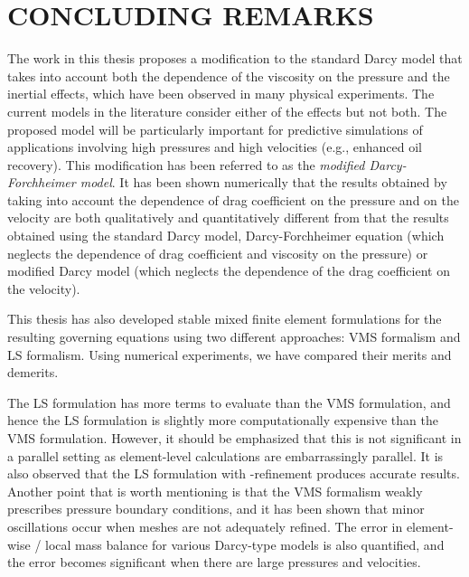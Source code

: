 \documentclass[11pt,reqno]{amsart}
\begin{document}
\section{CONCLUDING REMARKS}
\label{Ch:Conclusions}

The work in this thesis proposes a modification to the 
standard Darcy model that takes into account both the 
dependence of the viscosity on the pressure and the 
inertial effects, which have been observed in many 
physical experiments. The current models in the 
literature consider either of the effects but not 
both. The proposed model will be particularly important 
for predictive simulations of applications involving 
high pressures and high velocities (e.g., enhanced oil 
recovery). This modification has been referred to as the 
\emph{modified Darcy-Forchheimer model}. 
It has been shown numerically that the results obtained by 
taking into account the dependence of drag coefficient 
on the pressure and on the velocity are both qualitatively 
and quantitatively different from that the results obtained 
using the standard Darcy model, Darcy-Forchheimer equation 
(which neglects the dependence of drag coefficient and 
viscosity on the pressure) or modified Darcy model 
\cite{Nakshatrala_Rajagopal_IJNMF_2011_v67_p342,
Nakshatrala_Turner_2013_arXiv} (which neglects the 
dependence of the drag coefficient on the velocity). 

This thesis has also developed stable mixed finite element formulations 
for the resulting governing equations using two different 
approaches: VMS formalism and LS formalism. Using numerical experiments, 
we have compared their merits and demerits. 


The LS formulation has more terms to evaluate than the VMS formulation, 
and hence the LS formulation is slightly more computationally expensive 
than the VMS formulation. However, it should be emphasized that this is 
not significant in a parallel setting as element-level calculations are 
embarrassingly parallel. It is also observed that the LS formulation 
with -refinement produces accurate results. Another point that is 
worth mentioning is that the VMS formalism weakly prescribes pressure 
boundary conditions, and it has been shown that minor oscillations occur 
when meshes are not adequately refined. The error in element-wise / local 
mass balance for various Darcy-type models is also quantified, and the error 
becomes significant when there are large pressures and velocities. 
\end{document}
